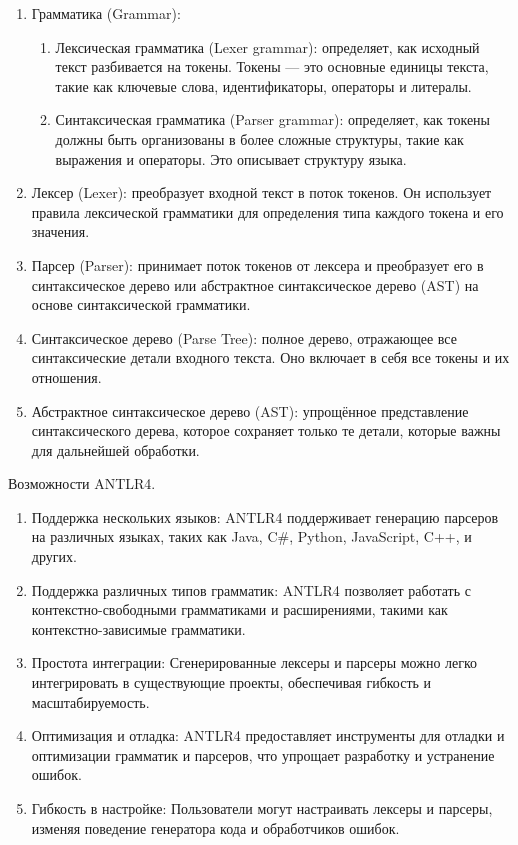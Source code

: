 \begin{enumerate}
  \item Грамматика (Grammar):
  \begin{enumerate}
    \item Лексическая грамматика (Lexer grammar): определяет, как исходный текст разбивается на токены. Токены — это основные единицы текста, такие как ключевые слова, идентификаторы, операторы и литералы.
    \item Синтаксическая грамматика (Parser grammar): определяет, как токены должны быть организованы в более сложные структуры, такие как выражения и операторы. Это описывает структуру языка.
  \end{enumerate}

  \item Лексер (Lexer): преобразует входной текст в поток токенов. Он использует правила лексической грамматики для определения типа каждого токена и его значения.

  \item Парсер (Parser): принимает поток токенов от лексера и преобразует его в синтаксическое дерево или абстрактное синтаксическое дерево (AST) на основе синтаксической грамматики.
  
  \item Синтаксическое дерево (Parse Tree): полное дерево, отражающее все синтаксические детали входного текста. Оно включает в себя все токены и их отношения.
  
  \item Абстрактное синтаксическое дерево (AST): упрощённое представление синтаксического дерева, которое сохраняет только те детали, которые важны для дальнейшей обработки.
\end{enumerate}


Возможности ANTLR4.

\begin{enumerate}
  \item Поддержка нескольких языков: ANTLR4 поддерживает генерацию парсеров на различных языках, таких как Java, C\#, Python, JavaScript, C++, и других.
  \item Поддержка различных типов грамматик: ANTLR4 позволяет работать с контекстно-свободными грамматиками и расширениями, такими как контекстно-зависимые грамматики.
  \item Простота интеграции: Сгенерированные лексеры и парсеры можно легко интегрировать в существующие проекты, обеспечивая гибкость и масштабируемость.
  \item Оптимизация и отладка: ANTLR4 предоставляет инструменты для отладки и оптимизации грамматик и парсеров, что упрощает разработку и устранение ошибок.
  \item Гибкость в настройке: Пользователи могут настраивать лексеры и парсеры, изменяя поведение генератора кода и обработчиков ошибок.
\end{enumerate}


